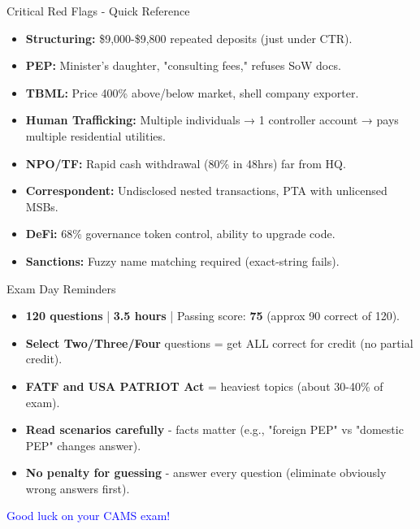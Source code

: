 \documentclass{beamer}
\begin{document}
	\begin{frame}{Critical Red Flags - Quick Reference}
		\begin{itemize}
			\item \textbf{Structuring:} \$9,000-\$9,800 repeated deposits (just under CTR).
			\item \textbf{PEP:} Minister's daughter, "consulting fees," refuses SoW docs.
			\item \textbf{TBML:} Price 400\% above/below market, shell company exporter.
			\item \textbf{Human Trafficking:} Multiple individuals → 1 controller account → pays multiple residential utilities.
			\item \textbf{NPO/TF:} Rapid cash withdrawal (80\% in 48hrs) far from HQ.
			\item \textbf{Correspondent:} Undisclosed nested transactions, PTA with unlicensed MSBs.
			\item \textbf{DeFi:} 68\% governance token control, ability to upgrade code.
			\item \textbf{Sanctions:} Fuzzy name matching required (exact-string fails).
		\end{itemize}
	\end{frame}
	
	\begin{frame}{Exam Day Reminders}
		\begin{itemize}
			\item \textbf{120 questions} | \textbf{3.5 hours} | Passing score: \textbf{75} (approx 90 correct of 120).
			\item \textbf{Select Two/Three/Four} questions = get ALL correct for credit (no partial credit).
			\item \textbf{FATF and USA PATRIOT Act} = heaviest topics (about 30-40\% of exam).
			\item \textbf{Read scenarios carefully} - facts matter (e.g., "foreign PEP" vs "domestic PEP" changes answer).
			\item \textbf{No penalty for guessing} - answer every question (eliminate obviously wrong answers first).
		\end{itemize}
		\vspace{0.5cm}
		\centering
		\textcolor{blue}{\Large Good luck on your CAMS exam!}
	\end{frame}
	
\end{document}
